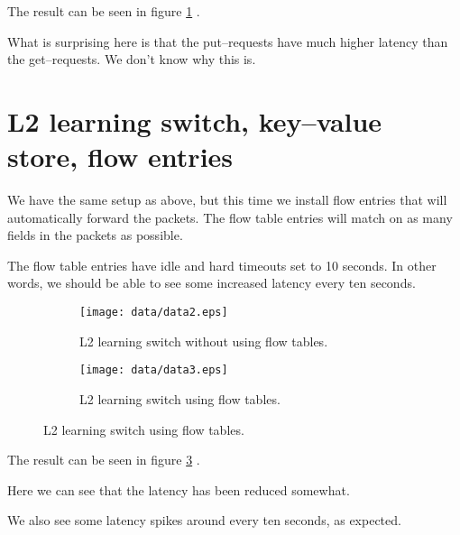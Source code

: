 The result can be seen in figure \ref{benchmark:l2.learning.switch.no.flows} 
.

What is surprising here is that the put--requests have much higher latency
than the get--requests. We don't know why this is.

\section{L2 learning switch, key--value store, flow entries}

We have the same setup as above, but this time we install flow entries that
will automatically forward the packets.  The flow table entries will match
on as many fields in the packets as possible.

The flow table entries have idle and hard timeouts set to 10 seconds.
In other words, we should be able to see some increased latency every ten
seconds.

\begin{figure}
  \centering
  \begin{subfigure}{\textwidth}
    \centering
    \texttt{[image: data/data2.eps]}
    \caption{L2 learning switch without using flow tables.}
    \label{benchmark:l2.learning.switch.no.flows}
  \end{subfigure}

  \centering
  \begin{subfigure}{\textwidth}
    \centering
    \texttt{[image: data/data3.eps]}
    \caption{L2 learning switch using flow tables.}
    \label{benchmark:l2.learning.switch.with.flows}
  \end{subfigure}
\end{figure}

The result can be seen in figure \ref{benchmark:l2.learning.switch.with.flows}
.

Here we can see that the latency has been reduced somewhat.

We also see some latency spikes around every ten seconds, as expected.


